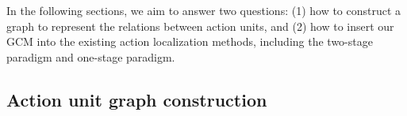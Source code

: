 \documentclass[10pt,journal,compsoc]{IEEEtran}
\begin{document}
	
	
	
	
	
	
	In the following sections, we aim to answer two questions: (1) how to construct a graph to represent the relations between action units, and (2) how to insert our GCM into the existing action localization methods, including the two-stage paradigm and one-stage paradigm.
	
	
	
	\subsection{Action unit graph construction}
	\label{Sec:construct}
	
\end{document}
